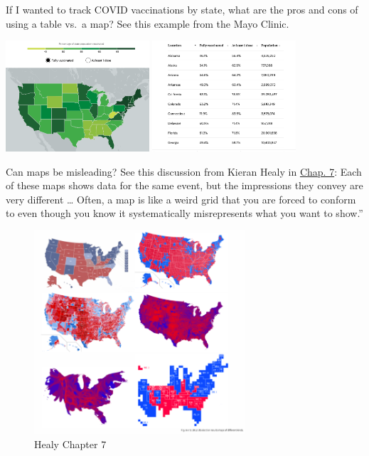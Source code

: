\documentclass[
  letterpaper,
  DIV=11,
  numbers=noendperiod]{scrreprt}
\begin{document}
If I wanted to track COVID vaccinations by state, what are the pros and
cons of using a table vs.~a map? See this example from the Mayo Clinic.

\includegraphics[width=0.4\textwidth,height=\textheight]{images/covidvaccmap.png}
\includegraphics[width=0.4\textwidth,height=\textheight]{images/covidvacctab.png}

Can maps be misleading? See this discussion from Kieran Healy in
\href{https://socviz.co/maps.html\#maps}{Chap. 7}: Each of these maps
shows data for the same event, but the impressions they convey are very
different \ldots{} Often, a map is like a weird grid that you are forced
to conform to even though you know it systematically misrepresents what
you want to show.''

\begin{figure}

{\centering \includegraphics[width=0.7\textwidth,height=\textheight]{images/healymap.png}

}

\caption{Healy Chapter 7}

\end{figure}
\end{document}
